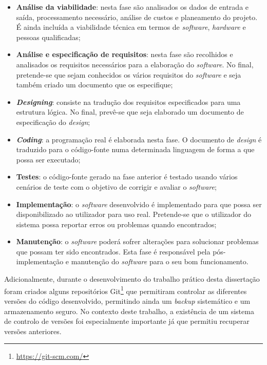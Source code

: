 \begin{itemize}
	\item \textbf{Análise da viabilidade}: nesta fase são analisados os dados de entrada e saída, processamento necessário, análise de custos e planeamento do projeto. É ainda incluída a viabilidade técnica em termos de \textit{software}, \textit{hardware} e pessoas qualificadas;
	
	\item \textbf{Análise e especificação de requisitos}: nesta fase são recolhidos e analisados os requisitos necessários para a elaboração do \textit{software}. No final, pretende-se que sejam conhecidos os vários requisitos do \textit{software} e seja também criado um documento que os especifique; 
	
	\item  \textbf{\textit{Designing}}: consiste na tradução dos requisitos especificados para uma estrutura lógica. No final, prevê-se que seja elaborado um documento de especificação do \textit{design}; 
	
	
	\item  \textbf{\textit{Coding}}: a programação real é elaborada nesta fase. O documento de \textit{design} é traduzido para o código-fonte numa determinada linguagem de forma a que possa ser executado;
	
	\item \textbf{Testes}: o código-fonte gerado na fase anterior é testado usando vários cenários de teste com o objetivo de corrigir e avaliar o \textit{software}; 
	
	\item  \textbf{Implementação}: o \textit{software} desenvolvido é implementado para que possa ser disponibilizado ao utilizador para uso real. Pretende-se que o utilizador do sistema possa reportar erros ou problemas quando encontrados; 
	
	\item  \textbf{Manutenção}: o \textit{software} poderá sofrer alterações para solucionar problemas que possam ter sido encontrados. Esta fase é responsável pela pós-implementação e manutenção do \textit{software} para o seu bom funcionamento.
	
\end{itemize}


Adicionalmente, durante o desenvolvimento do trabalho prático desta dissertação foram criados alguns repositórios Git\footnote{\url{https://git-scm.com/}} que permitiram controlar as diferentes versões do código desenvolvido, permitindo ainda um \textit{backup} sistemático e um armazenamento seguro. No contexto deste trabalho, a existência de um sistema de controlo de versões foi especialmente importante já que permitiu recuperar versões anteriores. 








